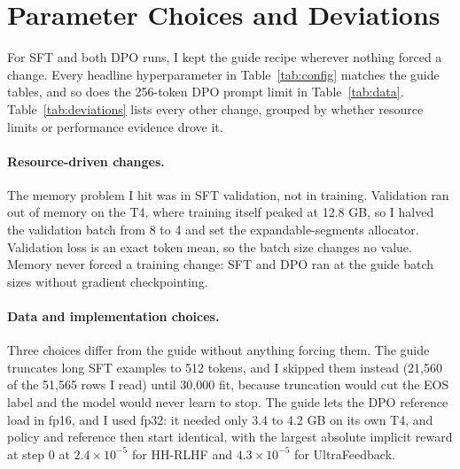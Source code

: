 \section{Parameter Choices and Deviations}
\label{sec:deviations}

For SFT and both DPO runs, I kept the guide recipe wherever nothing forced a change. Every headline hyperparameter in Table~\ref{tab:config} matches the guide tables, and so does the 256-token DPO prompt limit in Table~\ref{tab:data}. Table~\ref{tab:deviations} lists every other change, grouped by whether resource limits or performance evidence drove it.

\begin{table}[!t]
\centering
\caption{Changes from the guide, grouped by what drove them. ``My choice'' means the guide leaves the setting to me.}
\label{tab:deviations}

\end{table}

\paragraph{Resource-driven changes.} The memory problem I hit was in SFT validation, not in training. Validation ran out of memory on the T4, where training itself peaked at 12.8 GB, so I halved the validation batch from 8 to 4 and set the expandable-segments allocator. Validation loss is an exact token mean, so the batch size changes no value. Memory never forced a training change: SFT and DPO ran at the guide batch sizes without gradient checkpointing.

\paragraph{Data and implementation choices.} Three choices differ from the guide without anything forcing them. The guide truncates long SFT examples to 512 tokens, and I skipped them instead (21,560 of the 51,565 rows I read) until 30,000 fit, because truncation would cut the EOS label and the model would never learn to stop. The guide lets the DPO reference load in fp16, and I used fp32: it needed only 3.4 to 4.2 GB on its own T4, and policy and reference then start identical, with the largest absolute implicit reward at step 0 at $2.4\times10^{-5}$ for HH-RLHF and $4.3\times10^{-5}$ for UltraFeedback.


